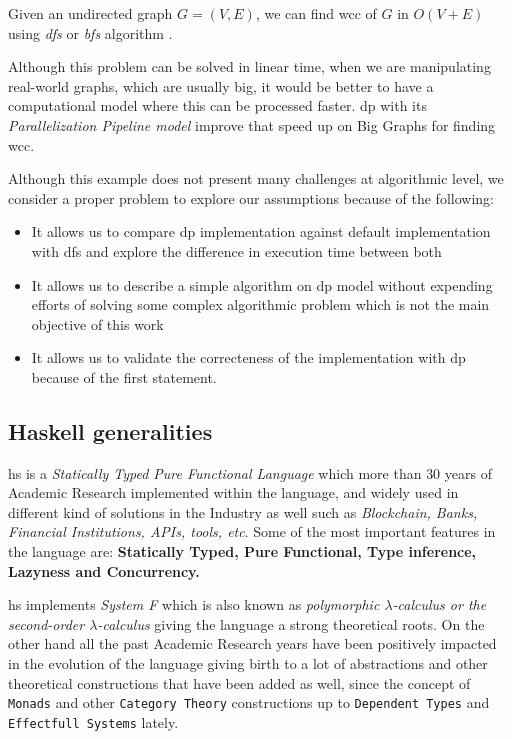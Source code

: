 \documentclass[preprint]{elsarticle}
\begin{document}
Given an undirected graph $G = (V, E)$, we can find \acrshort{wcc} of $G$ in $O(V + E)$ using \textit{\acrfull{dfs}} or \textit{\acrfull{bfs}} algorithm \citep{CormenLeisersonEtAl09}. 

Although this problem can be solved in linear time, when we are manipulating real-world graphs, which are usually big, it would be better to have a computational model where this can be processed faster. \acrshort{dp} with its \textit{Parallelization Pipeline model} improve that speed up on Big Graphs for finding \acrshort{wcc}.

Although this example does not present many challenges at algorithmic level, we consider a proper problem to explore our assumptions because of the following:

\begin{itemize}
    \item It allows us to compare \acrshort{dp} implementation against default implementation with \acrshort{dfs} and explore the difference in execution time between both
    \item It allows us to describe a simple algorithm on \acrshort{dp} model without expending efforts of solving some complex algorithmic problem which is not the main objective of this work
    \item It allows us to validate the correcteness of the implementation with \acrshort{dp} because of the first statement.
\end{itemize}



\subsection{Haskell generalities}
\acrshort{hs} is a \emph{Statically Typed Pure Functional Language} which more than $30$ years of Academic Research implemented within the language, and widely used in different kind of solutions in the Industry as well such as \emph{Blockchain, Banks, Financial Institutions, APIs, tools, etc}. Some of the most important features in the language are: \textbf{Statically Typed, Pure Functional, Type inference, Lazyness and Concurrency.} \cite{haskell}

\acrshort{hs} implements \emph{System F} \cite{systemf} which is also known as \textit{polymorphic $\lambda$-calculus or the second-order $\lambda$-calculus} giving the language a strong theoretical roots. On the other hand all the past Academic Research years have been positively impacted in the evolution of the language giving birth to a lot of abstractions and other theoretical constructions that have been added as well, since the concept of \texttt{Monads} \cite{monads} and other \texttt{Category Theory} \cite{arrows} constructions up to \texttt{Dependent Types} \cite{dependenttypes} and \texttt{Effectfull Systems} \cite{extensibleeff} lately. 
\end{document}
